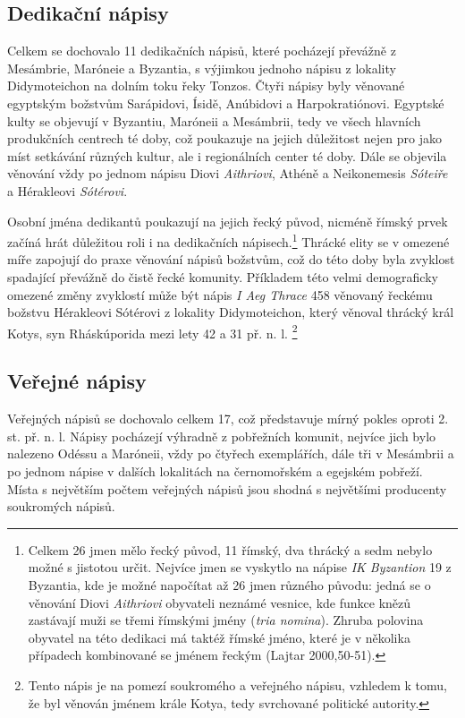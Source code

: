 \subsection[dedikační-nápisy-9]{Dedikační nápisy}

Celkem se dochovalo 11 dedikačních nápisů, které pocházejí převážně z Mesámbrie, Maróneie a Byzantia, s výjimkou jednoho nápisu z lokality Didymoteichon na dolním toku řeky Tonzos. Čtyři nápisy byly věnované egyptským božstvům Sarápidovi, Ísidě, Anúbidovi a Harpokratiónovi. Egyptské kulty se objevují v Byzantiu, Maróneii a Mesámbrii, tedy ve všech hlavních produkčních centrech té doby, což poukazuje na jejich důležitost nejen pro jako míst setkávání různých kultur, ale i regionálních center té doby. Dále se objevila věnování vždy po jednom nápisu Diovi {\em Aithriovi}, Athéně a Neikonemesis {\em Sóteiře} a Hérakleovi {\em Sótérovi}.

Osobní jména dedikantů poukazují na jejich řecký původ, nicméně římský prvek začíná hrát důležitou roli i na dedikačních nápisech.\footnote{Celkem 26 jmen mělo řecký původ, 11 římský, dva thrácký a sedm nebylo možné s jistotou určit. Nejvíce jmen se vyskytlo na nápise {\em IK Byzantion} 19 z Byzantia, kde je možné napočítat až 26 jmen různého původu: jedná se o věnování Diovi {\em Aithriovi} obyvateli neznámé vesnice, kde funkce knězů zastávají muži se třemi římskými jmény ({\em tria nomina}). Zhruba polovina obyvatel na této dedikaci má taktéž římské jméno, které je v několika případech kombinované se jménem řeckým (Lajtar 2000,50-51).} Thrácké elity se v omezené míře zapojují do praxe věnování nápisů božstvům, což do této doby byla zvyklost spadající převážně do čistě řecké komunity. Příkladem této velmi demograficky omezené změny zvyklostí může být nápis {\em I Aeg Thrace} 458 věnovaný řeckému božstvu Hérakleovi Sótérovi z lokality Didymoteichon, který věnoval thrácký král Kotys, syn Rháskúporida mezi lety 42 a 31 př. n. l. \footnote{Tento nápis je na pomezí soukromého a veřejného nápisu, vzhledem k tomu, že byl věnován jménem krále Kotya, tedy svrchované politické autority.}

\subsection[veřejné-nápisy-9]{Veřejné nápisy}

Veřejných nápisů se dochovalo celkem 17, což představuje mírný pokles oproti 2. st. př. n. l. Nápisy pocházejí výhradně z pobřežních komunit, nejvíce jich bylo nalezeno Odéssu a Maróneii, vždy po čtyřech exemplářích, dále tři v Mesámbrii a po jednom nápise v dalších lokalitách na černomořském a egejském pobřeží. Místa s největším počtem veřejných nápisů jsou shodná s největšími producenty soukromých nápisů.

